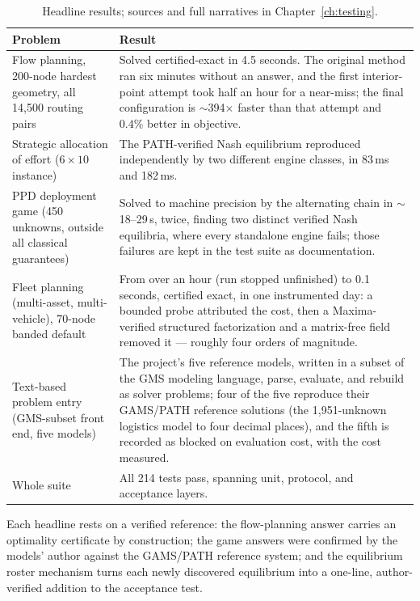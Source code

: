 \begin{table}[htbp]
\centering
\small
\begin{tabular}{p{} p{}}
\toprule
\textbf{Problem} & \textbf{Result} \\
\midrule
Flow planning, 200-node hardest geometry, all 14{,}500 routing pairs
  & Solved certified-exact in 4.5 seconds. The original method ran six
    minutes without an answer, and the first interior-point attempt took
    half an hour for a near-miss; the final configuration is
    $\sim$394$\times$ faster than that attempt and $0.4\%$ better in
    objective. \\
\addlinespace
Strategic allocation of effort ($6 \times 10$ instance)
  & The PATH-verified Nash equilibrium reproduced independently by two
    different engine classes, in 83\,ms and 182\,ms. \\
\addlinespace
PPD deployment game (450 unknowns, outside all classical guarantees)
  & Solved to machine precision by the alternating chain in
    $\sim$18--29\,s, twice, finding two distinct verified Nash
    equilibria, where every standalone engine fails; those failures are
    kept in the test suite as documentation. \\
\addlinespace
Fleet planning (multi-asset, multi-vehicle), 70-node banded default
  & From over an hour (run stopped unfinished) to 0.1 seconds, certified
    exact, in one instrumented day: a bounded probe attributed the cost,
    then a Maxima-verified structured factorization and a matrix-free
    field removed it --- roughly four orders of magnitude. \\
\addlinespace
Text-based problem entry (GMS-subset front end, five models)
  & The project's five reference models, written in a subset of the GMS
    modeling language, parse, evaluate, and rebuild as solver problems;
    four of the five reproduce their GAMS/PATH reference solutions (the
    1{,}951-unknown logistics model to four decimal places), and the
    fifth is recorded as blocked on evaluation cost, with the cost
    measured. \\
\addlinespace
Whole suite
  & All 214 tests pass, spanning unit, protocol, and acceptance layers. \\
\bottomrule
\end{tabular}
\caption{Headline results; sources and full narratives in
Chapter~\ref{ch:testing}.}
\label{tab:headline}
\end{table}

Each headline rests on a verified reference: the flow-planning answer
carries an optimality certificate by construction; the game answers were
confirmed by the models' author against the GAMS/PATH reference system;
and the equilibrium roster mechanism turns each newly discovered
equilibrium into a one-line, author-verified addition to the acceptance
test.

